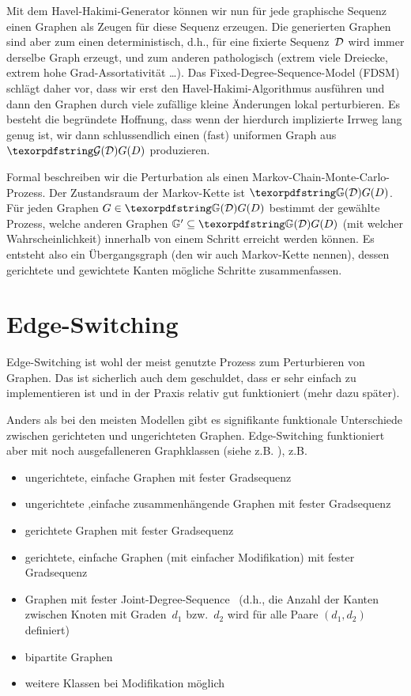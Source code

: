 Mit dem Havel-Hakimi-Generator können wir nun für jede graphische Sequenz einen Graphen als Zeugen für diese Sequenz erzeugen.
Die generierten Graphen sind aber zum einen deterministisch, d.h., für eine fixierte Sequenz~$\mathcal{D}$ wird immer derselbe Graph erzeugt, und zum anderen pathologisch (extrem viele Dreiecke, extrem hohe Grad-Assortativität \ldots).
Das Fixed-Degree-Sequence-Model (FDSM) schlägt daher vor, dass wir erst den Havel-Hakimi-Algorithmus ausführen und dann den Graphen durch viele zufällige kleine Änderungen lokal perturbieren.
Es besteht die begründete Hoffnung, dass wenn der hierdurch implizierte Irrweg lang genug ist, wir dann schlussendlich einen (fast) uniformen Graph aus $\Gd$ produzieren.

Formal beschreiben wir die Perturbation als einen Markov-Chain-Monte-Carlo-Prozess.
Der Zustandsraum der Markov-Kette ist $\gd$.
Für jeden Graphen $G \in \gd$ bestimmt der gewählte Prozess, welche anderen Graphen $\mathbb G' \subseteq \gd$ (mit welcher Wahrscheinlichkeit) innerhalb von einem Schritt erreicht werden können.
Es entsteht also ein  Übergangsgraph (den wir auch Markov-Kette nennen), dessen gerichtete und gewichtete Kanten mögliche Schritte zusammenfassen.

\section{Edge-Switching}
Edge-Switching ist wohl der meist genutzte Prozess zum Perturbieren von Graphen.
Das ist sicherlich auch dem geschuldet, dass er sehr einfach zu implementieren ist und in der Praxis relativ gut funktioniert (mehr dazu später).

Anders als bei den meisten Modellen gibt es signifikante funktionale Unterschiede zwischen gerichteten und ungerichteten Graphen.
Edge-Switching funktioniert aber mit noch ausgefalleneren Graphklassen (siehe z.B. \cite{carstens_2017}), z.B.
\begin{itemize}
    \item ungerichtete, einfache Graphen mit fester Gradsequenz
    \item ungerichtete ,einfache zusammenhängende Graphen  mit fester Gradsequenz \cite{DBLP:journals/compnet/VigerL16}
    \item gerichtete Graphen  mit fester Gradsequenz
    \item gerichtete, einfache Graphen (mit einfacher Modifikation)  mit fester Gradsequenz
    \item Graphen mit fester Joint-Degree-Sequence~\cite{DBLP:conf/alenex/StantonP11} (d.h., die Anzahl der Kanten zwischen Knoten mit Graden~$d_1$ bzw.~$d_2$ wird für alle Paare $(d_1, d_2)$ definiert)
    \item bipartite Graphen
    \item weitere Klassen bei Modifikation möglich
\end{itemize}

